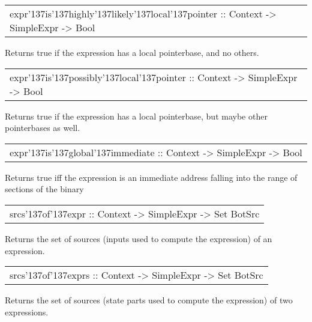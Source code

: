 \begin{haddockdesc}
\item[\begin{tabular}{@{}l}
expr{\char '137}is{\char '137}highly{\char '137}likely{\char '137}local{\char '137}pointer :: Context -> SimpleExpr -> Bool
\end{tabular}]
{\haddockbegindoc
Returns true if the expression has a local pointerbase, and no others.\par}
\end{haddockdesc}
\begin{haddockdesc}
\item[\begin{tabular}{@{}l}
expr{\char '137}is{\char '137}possibly{\char '137}local{\char '137}pointer :: Context -> SimpleExpr -> Bool
\end{tabular}]
{\haddockbegindoc
Returns true if the expression has a local pointerbase, but maybe other pointerbases as well.\par}
\end{haddockdesc}
\begin{haddockdesc}
\item[\begin{tabular}{@{}l}
expr{\char '137}is{\char '137}global{\char '137}immediate :: Context -> SimpleExpr -> Bool
\end{tabular}]
{\haddockbegindoc
Returns true iff the expression is an immediate address falling into the range of sections of the binary\par}
\end{haddockdesc}
\begin{haddockdesc}
\item[\begin{tabular}{@{}l}
srcs{\char '137}of{\char '137}expr :: Context -> SimpleExpr -> Set BotSrc
\end{tabular}]
{\haddockbegindoc
Returns the set of sources (inputs used to compute the expression) of an expression.\par}
\end{haddockdesc}
\begin{haddockdesc}
\item[\begin{tabular}{@{}l}
srcs{\char '137}of{\char '137}exprs :: Context -> {\char 91}SimpleExpr{\char 93} -> Set BotSrc
\end{tabular}]
{\haddockbegindoc
Returns the set of sources (state parts used to compute the expression) of two expressions.\par}
\end{haddockdesc}
